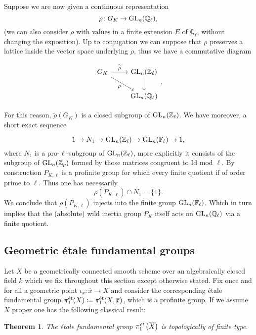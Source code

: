 \documentclass[10pt,a4paper]{amsart}
\numberwithin{equation}{subsection}
\theoremstyle{plain}
\newtheorem{theorem}{Theorem}[section]
\theoremstyle{definition}
\theoremstyle{remark}
\numberwithin{equation}{section}
\begin{document}
Suppose we are now given a continuous representation
	\[
		\rho \colon G_K \to \mathrm{GL}_n ( \mathbb{Q}_\ell),
	\]
(we can also consider $\rho$ with values in a finite extension $E$ of $\mathbb{Q}_\ell$, without changing the exposition). Up to conjugation we can suppose that $\rho$ preserves a lattice inside the vector space underlying $\rho$, thus we have a
commutative diagram

	\[
	\begin{tikzcd}
		G_K \ar{r}{\widetilde{\rho}} \ar{dr}[swap]{\rho} & \GLn(\bZ_\ell) \ar{d} \\
						& \GLn(\Q_\ell)
	\end{tikzcd}.
	\]
	
For this reason, $\widetilde{\rho} \left( G_K \right) $ is a closed subgroup of $\mathrm{GL}_n(\mathbb Z_\ell)$. We have moreover, a short exact sequence

	\[
		1 \to N_1 \to \mathrm{GL}_n(\mathbb Z_\ell) \to \mathrm{GL}_n(\mathbb F_\ell) \to 1,
	\]
where $N_1$ is a pro-$\ell$-subgroup of $\mathrm{GL}_n(\mathbb Z_\ell)$, more explicitly it consists of the subgroup of $\mathrm{GL}_n(\mathbb Z_p)$ formed by those matrices congruent to $\mathrm{Id}$ mod $\ell$.
By construction $P_{K, \ell}$ is a profinite group for which every finite quotient if of order prime to $\ell$. Thus one has necessarily
	\[
		\rho \left( P_{K, \ell}  \right) \cap N_1 = \{1 \}.
	\] 
We conclude that $\rho( P_{K, \ell})$ injects into the finite group $\mathrm{GL}_n(\mathbb F_\ell)$. Which in turn implies that the (absolute) wild inertia group $P_K$ itself acts on $\mathrm{GL}_n(\mathbb{Q}_\ell)$ via a finite quotient. 

\subsection{Geometric \'etale fundamental groups}
Let $X$ be a geometrically connected smooth scheme over an algebraically closed field $k$ which we fix throughout this section except otherwise stated.
Fix once and for all a geometric point $\iota_x \colon \overline{x} \to X$ and consider the corresponding \'etale fundamental group $\pi_1^{\text{\'et}}(X) \coloneqq \pi_1^{\text{\'et}}(X, \overline{x})$, which is a profinite group. If we assume $X$ proper one has the following
classical result:

\begin{theorem}{\cite[Expos\'e 10, Thm 2.9]{grothendieckSGA1}} \label{proper_case}
The \'etale fundamental group $\pi^\emph{\text{\'et}}_1 \left( \overline{X} \right)$ is topologically of finite type.
\end{theorem}
\end{document}
